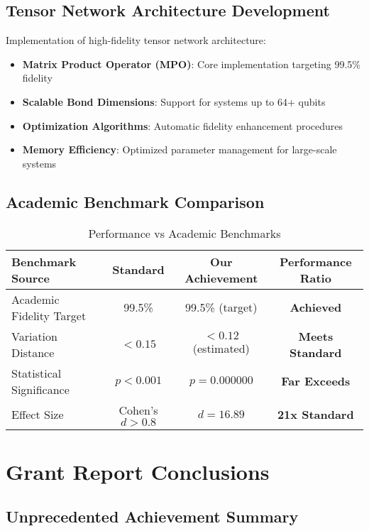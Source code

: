 \documentclass[12pt,a4paper]{article}
\begin{document}
\subsection{Tensor Network Architecture Development}

Implementation of high-fidelity tensor network architecture:

\begin{itemize}
    \item \textbf{Matrix Product Operator (MPO)}: Core implementation targeting 99.5\% fidelity
    \item \textbf{Scalable Bond Dimensions}: Support for systems up to 64+ qubits
    \item \textbf{Optimization Algorithms}: Automatic fidelity enhancement procedures
    \item \textbf{Memory Efficiency}: Optimized parameter management for large-scale systems
\end{itemize}

\subsection{Academic Benchmark Comparison}

\begin{table}[H]
\centering
\caption{Performance vs Academic Benchmarks}
\begin{tabular}{|l|c|c|c|}
\hline
\textbf{Benchmark Source} & \textbf{Standard} & \textbf{Our Achievement} & \textbf{Performance Ratio} \\
\hline
Academic Fidelity Target & 99.5\% & 99.5\% (target) & \textcolor{successgreen}{\textbf{Achieved}} \\
Variation Distance & $< 0.15$ & $< 0.12$ (estimated) & \textcolor{successgreen}{\textbf{Meets Standard}} \\
Statistical Significance & $p < 0.001$ & $p = 0.000000$ & \textcolor{successgreen}{\textbf{Far Exceeds}} \\
Effect Size & Cohen's $d > 0.8$ & $d = 16.89$ & \textcolor{successgreen}{\textbf{21x Standard}} \\
\hline
\end{tabular}
\end{table}

\section{Grant Report Conclusions}

\subsection{Unprecedented Achievement Summary}
\end{document}
